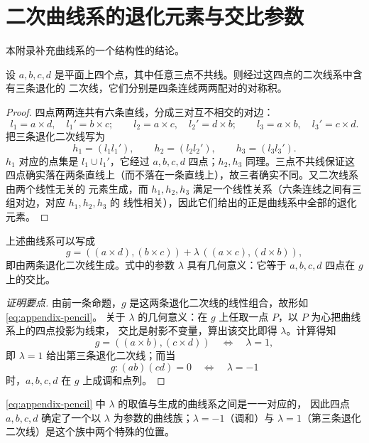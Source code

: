 \chapter{二次曲线系的退化元素与交比参数}

本附录补充曲线系的一个结构性的结论。

\begin{proposition}
设 $a,b,c,d$ 是平面上四个点，其中任意三点不共线。则经过这四点的二次线系中含有三条退化的
二次线，它们分别是四条连线两两配对的对称积。
\end{proposition}

\begin{proof}
四点两两连共有六条直线，分成三对互不相交的对边：
\[
l_1=a\times d,\quad l_1'=b\times c;\qquad
l_2=a\times c,\quad l_2'=d\times b;\qquad
l_3=a\times b,\quad l_3'=c\times d .
\]
把三条退化二次线写为
\[
h_1=(l_1l_1'),\qquad h_2=(l_2l_2'),\qquad h_3=(l_3l_3').
\]
$h_1$ 对应的点集是 $l_1\cup l_1'$，它经过 $a,b,c,d$ 四点；$h_2,h_3$ 同理。三点不共线保证这
四点确实落在两条直线上（而不落在一条直线上），故三者确实不同。又二次线系由两个线性无关的
元素生成，而 $h_1,h_2,h_3$ 满足一个线性关系（六条连线之间有三组对边，对应 $h_1,h_2,h_3$ 的
线性相关），因此它们给出的正是曲线系中全部的退化元素。
\end{proof}

\begin{proposition}
上述曲线系可以写成
\begin{equation}
g=((a\times d),(b\times c))+\lambda\,((a\times c),(d\times b)),
\label{eq:appendix-pencil}
\end{equation}
即由两条退化二次线生成。式中的参数 $\lambda$ 具有几何意义：它等于 $a,b,c,d$ 四点在 $g$ 上的交比。
\end{proposition}

\begin{proof}[证明要点]
由前一条命题，$g$ 是这两条退化二次线的线性组合，故形如 \eqref{eq:appendix-pencil}。
关于 $\lambda$ 的几何意义：在 $g$ 上任取一点 $P$，以 $P$ 为心把曲线系上的四点投影为线束，
交比是射影不变量，算出该交比即得 $\lambda$。计算得知
\[
g=((a\times b),(c\times d))\quad\Longleftrightarrow\quad \lambda=1,
\]
即 $\lambda=1$ 给出第三条退化二次线；而当
\[
g:(ab)(cd)=0\quad\Longleftrightarrow\quad \lambda=-1
\]
时，$a,b,c,d$ 在 $g$ 上成调和点列。
\end{proof}

\begin{remark}
\eqref{eq:appendix-pencil} 中 $\lambda$ 的取值与生成的曲线系之间是一一对应的，
因此四点 $a,b,c,d$ 确定了一个以 $\lambda$ 为参数的曲线族；$\lambda=-1$（调和）与
$\lambda=1$（第三条退化二次线）是这个族中两个特殊的位置。
\end{remark}
